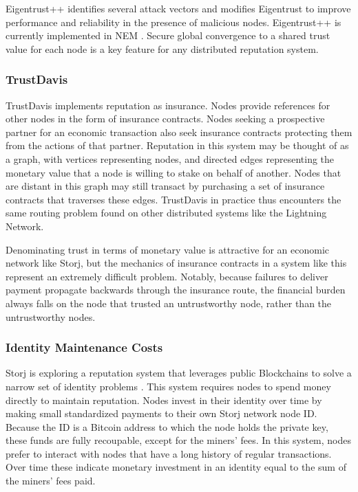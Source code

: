 \documentclass[a4paper,10pt]{article}
\begin{document}
Eigentrust++ \cite{20} identifies several attack vectors and modifies Eigentrust to improve performance and reliability in the presence of malicious nodes. Eigentrust++ is currently implemented in NEM \cite{21}.  Secure global convergence to a shared trust value for each node is a key feature for any distributed reputation system.

\subsubsection{TrustDavis}
TrustDavis \cite{22} implements reputation as insurance. Nodes provide references for other nodes in the form of insurance contracts. Nodes seeking a prospective partner for an economic transaction also seek insurance contracts protecting them from the actions of that partner. Reputation in this system may be thought of as a graph, with vertices representing nodes, and directed edges representing the monetary value that a node is willing to stake on behalf of another. Nodes that are distant in this graph may still transact by purchasing a set of insurance contracts that traverses these edges. TrustDavis in practice thus encounters the same routing problem found on other distributed systems like the Lightning Network.

Denominating trust in terms of monetary value is attractive for an economic network like Storj, but the mechanics of insurance contracts in a system like this represent an extremely difficult problem.  Notably, because failures to deliver payment propagate backwards through the insurance route, the financial burden always falls on the node that trusted an untrustworthy node, rather than the untrustworthy nodes.

\subsubsection{Identity Maintenance Costs}
Storj is exploring a reputation system that leverages public Blockchains to solve a narrow set of identity problems \cite{23}. This system requires nodes to spend money directly to maintain reputation. Nodes invest in their identity over time by making small standardized payments to their own Storj network node ID. Because the ID is a Bitcoin address to which the node holds the private key, these funds are fully recoupable, except for the miners’ fees. In this system, nodes prefer to interact with nodes that have a long history of regular transactions. Over time these indicate monetary investment in an identity equal to the sum of the miners’ fees paid.
\end{document}

